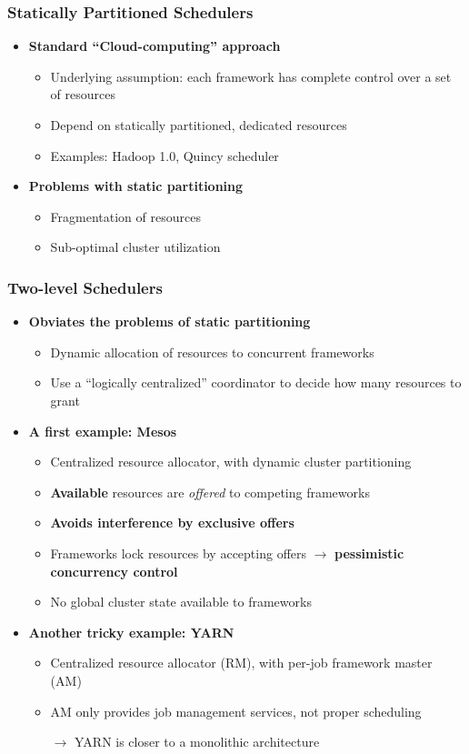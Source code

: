 \begin{frame}\frametitle{Statically Partitioned Schedulers}
\begin{itemize}
	\item {\bf Standard ``Cloud-computing'' approach}
	\begin{itemize}
		\item Underlying assumption: each framework has complete control over a set of resources
		\item Depend on statically partitioned, dedicated resources
		\item Examples: Hadoop 1.0, Quincy scheduler
	\end{itemize}

\vspace{20pt}

	\item {\bf Problems with static partitioning}
	\begin{itemize}
		\item Fragmentation of resources
		\item Sub-optimal cluster utilization
	\end{itemize}
\end{itemize}
\end{frame}

\begin{frame}\frametitle{Two-level Schedulers}
\begin{itemize}
	\item {\bf Obviates the problems of static partitioning}
	\begin{itemize}
		\item Dynamic allocation of resources to concurrent frameworks
		\item Use a ``logically centralized'' coordinator to decide how many resources to grant
	\end{itemize}
	\item {\bf A first example: Mesos}
	\begin{itemize}
		\item Centralized resource allocator, with dynamic cluster partitioning
		\item {\bf Available} resources are {\it offered} to competing frameworks
		\item {\color{red} {\bf Avoids interference by exclusive offers}}
		\item Frameworks lock resources by accepting offers $\to$ {\bf pessimistic concurrency control}
		\item No global cluster state available to frameworks
	\end{itemize}
	\item {\bf Another tricky example: YARN}
	\begin{itemize}
		\item Centralized resource allocator (RM), with per-job framework master (AM)
		\item AM only provides job management services, not proper scheduling
		\item[$\to$] YARN is closer to a monolithic architecture
	\end{itemize}
\end{itemize}
\end{frame}

